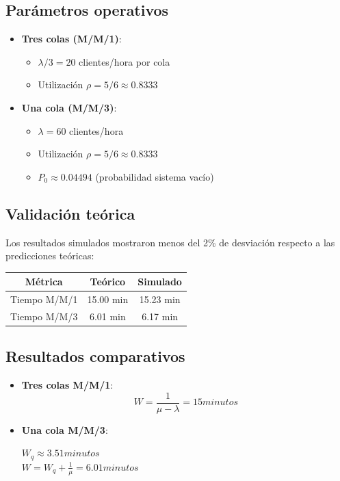 \documentclass{article}
\begin{document}
\subsection{Parámetros operativos}
\begin{itemize}
\item \textbf{Tres colas (M/M/1)}:
  \begin{itemize}
  \item $\lambda/3 = 20$ clientes/hora por cola
  \item Utilización $\rho = 5/6 \approx 0.8333$
  \end{itemize}
  
\item \textbf{Una cola (M/M/3)}:
  \begin{itemize}
  \item $\lambda = 60$ clientes/hora
  \item Utilización $\rho = 5/6 \approx 0.8333$
  \item $P_0 \approx 0.04494$ (probabilidad sistema vacío)
  \end{itemize}
\end{itemize}

\subsection{Validación teórica}
Los resultados simulados mostraron menos del 2\% de desviación respecto a las predicciones teóricas:

\begin{tabular}{|c|c|c|}
\hline
\textbf{Métrica} & \textbf{Teórico} & \textbf{Simulado} \\ \hline
Tiempo M/M/1 & 15.00 min & 15.23 min \\ \hline
Tiempo M/M/3 & 6.01 min & 6.17 min \\ \hline
\end{tabular}

\subsection{Resultados comparativos}
\begin{itemize}
\item \textbf{Tres colas M/M/1}:
  \[ W = \frac{1}{\mu - \lambda} = 15  minutos \]
  
\item \textbf{Una cola M/M/3}:
  \begin{center}
    $W_q \approx 3.51 minutos $\\
    $ W = W_q + \frac{1}{\mu} = 6.01  minutos$
  \end{center}
\end{itemize}
\end{document}
